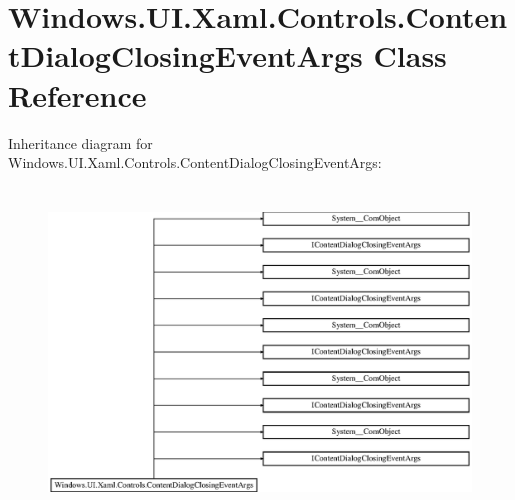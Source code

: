 \hypertarget{class_windows_1_1_u_i_1_1_xaml_1_1_controls_1_1_content_dialog_closing_event_args}{}\section{Windows.\+U\+I.\+Xaml.\+Controls.\+Content\+Dialog\+Closing\+Event\+Args Class Reference}
\label{class_windows_1_1_u_i_1_1_xaml_1_1_controls_1_1_content_dialog_closing_event_args}
Inheritance diagram for Windows.\+U\+I.\+Xaml.\+Controls.\+Content\+Dialog\+Closing\+Event\+Args\+:\begin{figure}[H]
\begin{center}
\leavevmode
\includegraphics[height=8.750000cm]{class_windows_1_1_u_i_1_1_xaml_1_1_controls_1_1_content_dialog_closing_event_args}
\end{center}
\end{figure}
